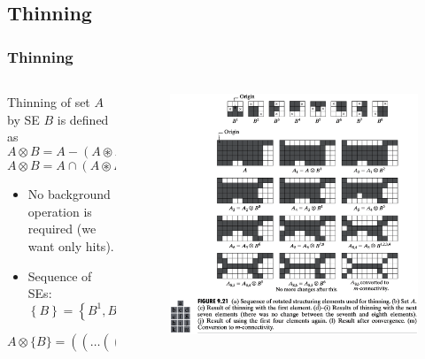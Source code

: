 \subsection{Thinning}

\begin{frame}
\frametitle{Thinning}
\begin{columns}
\begin{column}{.4\textwidth}
\scriptsize
Thinning of set $A$ by SE $B$ is defined as
\[
A \otimes B = A - \left ( A \circledast B  \right )
\]
\[
A \otimes B = A \cap \left ( A \circledast B \right )^{c}.
\]
\begin{itemize}
\item No background operation is required (we want only hits).
\item Sequence of SEs:
\[
\left \{ B \right \} = \left \{ B^{1}, B^{2}, \ldots, B^{n} \right \}.
\]
\end{itemize}
\[
A \otimes \{B\} = ((\ldots ((A\otimes B^{1} ) \otimes B^{2} ) \ldots ) \otimes B^{n})
\]
\normalsize
\end{column}
\begin{column}{.6\textwidth}
\begin{figure}[!h]
\includegraphics[width=\textwidth]{fig-9-21.png}
\end{figure}
\end{column}
\end{columns}
\end{frame}

